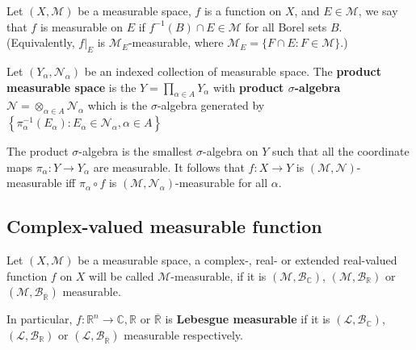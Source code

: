 \documentclass[12pt, a4paper, oneside]{book}
\begin{document}
\begin{definition}
    Let $(X, \mathcal{M})$ be a measurable space, $f$ is a function on $X$, and $E \in \mathcal{M}$, we say that $f$ is measurable on $E$ if $f^{-1}(B) \cap E \in \mathcal{M}$ for all Borel sets $B$. (Equivalently, $\left.f\right|_E$ is $\mathcal{M}_E$-measurable, where $\mathcal{M}_E=\{F \cap E: F \in \mathcal{M}\}$.)
\end{definition}


\begin{definition}
    Let $\left(Y_\alpha,\mathcal{N}_\alpha\right)$ be an indexed collection of measurable space.
    The \textbf{product measurable space} is the  $Y= \prod_{\alpha \in A} Y_\alpha$ with \textbf{product $\sigma$-algebra} $\mathcal{N}=\otimes_{\alpha \in A} \mathcal{N}_\alpha$ which is the $\sigma$-algebra generated by $\left\{\pi_\alpha^{-1}\left(E_\alpha\right): E_\alpha \in \mathcal{N}_\alpha, \alpha \in A\right\}$
    \begin{remark}
        The product $\sigma$-algebra is the smallest $\sigma$-algebra on $Y$ such that all the coordinate maps $\pi_\alpha: Y \rightarrow Y_\alpha$ are measurable.
        It follows that $f: X \rightarrow Y$ is $(\mathcal{M}, \mathcal{N})$-measurable iff $\pi_\alpha \circ f$ is $\left(\mathcal{M}, \mathcal{N}_\alpha\right)$-measurable for all $\alpha$.
    \end{remark}
\end{definition}



\subsection{Complex-valued measurable function}

\begin{definition}
    Let $\left(X, \mathcal{M}\right)$ be a measurable space, a  complex-, real- or extended real-valued function $f$ on $X$ will be called $\mathcal{M}$-measurable, if it is $\left(\mathcal{M}, \mathcal{B}_{\mathbb{C}}\right)$, $\left(\mathcal{M}, \mathcal{B}_{\mathbb{R}}\right)$ or $\left(\mathcal{M}, \mathcal{B}_{\overline{\mathbb{R}}}\right)$ measurable.

    In particular, $f: \mathbb{R}^n \rightarrow \mathbb{C}, \mathbb{R}$ or $\overline{\mathbb{R}}$ is \textbf{Lebesgue  measurable} if it is $\left(\mathcal{L}, \mathcal{B}_{\mathbb{C}}\right)$, $\left(\mathcal{L}, \mathcal{B}_{\mathbb{R}}\right)$ or $\left(\mathcal{L}, \mathcal{B}_{\overline{\mathbb{R}}}\right)$ measurable respectively.
\end{definition}
\end{document}
